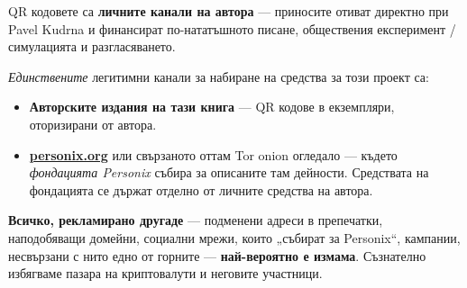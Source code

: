 \begin{minipage}[t]{0.60\textwidth}
\vspace{0pt}
\begin{mdframed}[
  linewidth=0.7pt,roundcorner=5pt,
  innerleftmargin=10pt,innerrightmargin=10pt,
  innertopmargin=8pt,innerbottommargin=8pt,
  skipabove=0pt,skipbelow=0pt,
  linecolor=cbwarning!50,backgroundcolor=cbwarning!5,
  nobreak=true,
  needspace=4\baselineskip,
]
\footnotesize
QR кодовете са \textbf{личните канали на автора} --- приносите отиват директно при Pavel Kudrna и финансират по-нататъшното писане, обществения експеримент / симулацията и разгласяването.

\smallskip
\emph{Единствените} легитимни канали за набиране на средства за този проект са:

\smallskip
\begin{itemize}
\setlength{\itemsep}{0pt}
\setlength{\topsep}{0pt}
\item \textbf{Авторските издания на тази книга} --- QR кодове в екземпляри, оторизирани от автора.
\item \href{https://personix.org}{\textbf{personix.org}} или свързаното оттам Tor onion огледало --- където \emph{фондацията Personix} събира за описаните там дейности. Средствата на фондацията се държат отделно от личните средства на автора.
\end{itemize}

\smallskip
\textbf{Всичко, рекламирано другаде} --- подменени адреси в препечатки, наподобяващи домейни, социални мрежи, които „събират за Personix“, кампании, несвързани с нито едно от горните --- \textbf{най-вероятно е измама}. Съзнателно избягваме пазара на криптовалути и неговите участници.
\end{mdframed}
\end{minipage}

\clearpage
